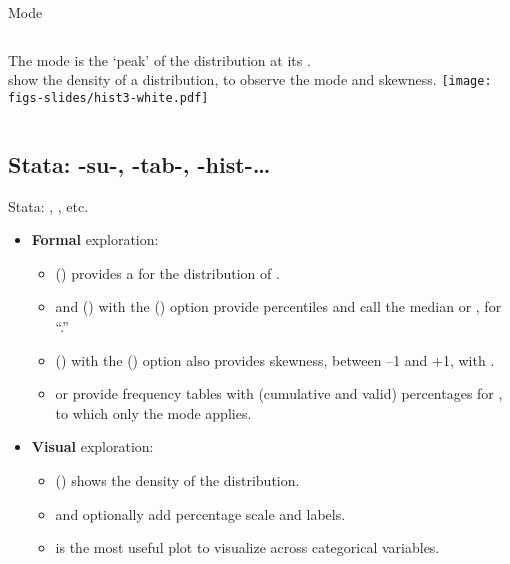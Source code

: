 \documentclass{beamer}
\begin{document}
	\begin{frame}[t]{Mode}
	\begin{columns}[T]
	The mode is the `peak' of the distribution at its .\\[1em]
	
	 show the density of a distribution, to observe the mode and skewness.
	\texttt{[image: figs-slides/hist3-white.pdf]}
	\end{columns}

	\end{frame}

	\subsection{Stata: -su-, -tab-, -hist-…}
	
	\begin{frame}[t]{Stata: , ,  etc.}
		
	\begin{itemize}
	\item \textbf{Formal} exploration:
	\begin{itemize}
		\item {} () provides a  for the distribution of .
		\item {} and  () with the  () option provide percentiles and call the median  or , for ``.''
		\item {} () with the  () option also provides skewness, between --1 and +1, with .
		\item {} or  provide frequency tables with (cumulative and valid) percentages for , to which only the mode applies.
	\end{itemize}
	
	\item \textbf{Visual} exploration:
	\begin{itemize}
		\item {} () shows the density of the distribution.
		\item {} and  optionally add percentage scale and labels.
		\item {} is the most useful plot to visualize across categorical variables.
	\end{itemize}
	\end{itemize}
	
	\end{frame}
\end{document}
